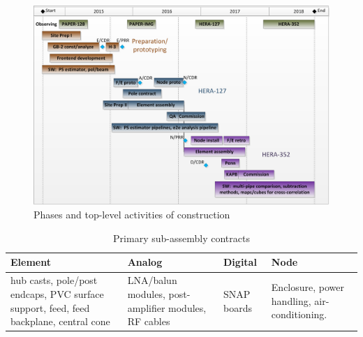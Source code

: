 \documentclass[preprint]{aastex}
\begin{document}
\begin{figure}[htb]
\centering
\includegraphics[width=\textwidth]{plots/schedule.png}
\caption{Phases and top-level activities of construction}
\label{fig:scheduleSummary}
\end{figure}

\begin{table}[tbh]
\centering
\caption{Primary sub-assembly contracts} \label{tab:subassycontracts}
\begin{tabular}{| p{1.4in} | p{1.4in} | p{1.4in} | p{1.4in} |}\hline
\textbf{Element} & \textbf{Analog} & \textbf{Digital} & \textbf{Node} \\ \hline
\raggedright{hub casts, pole/post endcaps, PVC surface support, feed, feed backplane, central cone} &
\raggedright{LNA/balun modules, post-amplifier modules, RF cables} &
\raggedright{SNAP boards} &
Enclosure, power handling, air-conditioning. \\ \hline
\end{tabular}
\end{table}
\end{document}
